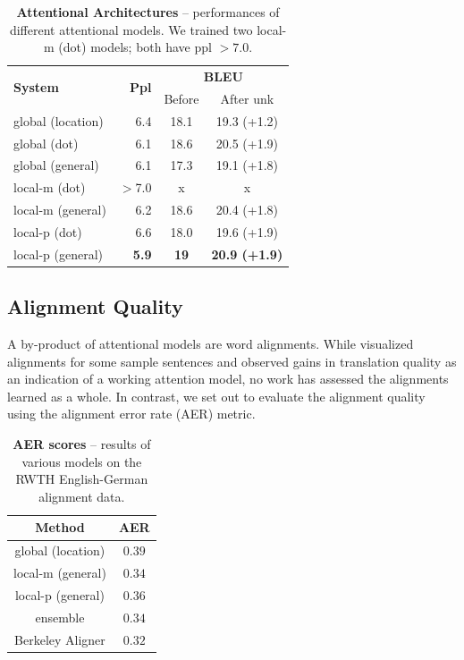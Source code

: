 \begin{table}
\centering
\begin{tabular}{l|r|c|c}
\multirow{ 2}{*}{\bf{System}} & \multirow{ 2}{*}{\bf{Ppl}} &
\multicolumn{2}{c}{{\bf BLEU}}\\
\cline{3-4}
& & Before & After unk \\
  \hline
global (location) & 6.4 & 18.1 & 19.3 (+1.2) \\
global (dot) & 6.1 & 18.6 & 20.5 (+1.9) \\
global (general) & 6.1 & 17.3 & 19.1 (+1.8) \\
  \hline
local-m (dot) & $>$7.0 & x & x \\
local-m (general) & 6.2 & 18.6 & 20.4 (+1.8) \\
  \hline
local-p (dot) & 6.6 & 18.0 & 19.6 (+1.9) \\
local-p (general) & {\bf 5.9} & {\bf 19} & {\bf 20.9 (+1.9)} \\
\end{tabular}
\caption[Attentional Architectures]{{\bf Attentional Architectures} -- performances of different
attentional
models. We trained two local-m (dot) models; both have
ppl $>7.0$.}
\label{t:attnChoices}
\end{table}

\subsection{Alignment Quality}
A by-product of attentional models are word alignments. While \cite{bog15}
visualized alignments for some sample sentences and 
observed gains in translation quality as an indication of a working attention
model, no work has assessed the alignments learned as a whole. In contrast, we
set out to evaluate the alignment quality using the alignment error rate (AER)
metric.

\begin{table}
  \begin{center}
    \begin{tabular}{c c}
      {\bf Method} & {\bf AER} \\
      \hline
      global (location) & $0.39$ \\
      local-m (general)  & $0.34$ \\
      local-p (general) & $0.36$ \\
      \hdashline
      ensemble & $0.34$ \\
      \hline
      Berkeley Aligner & $0.32$ \\
    \end{tabular}
  \end{center}
  \caption[AER scores]{{\bf AER scores} -- results of various models on the RWTH
  English-German alignment data.}
  \label{t:alignment}
\end{table}

